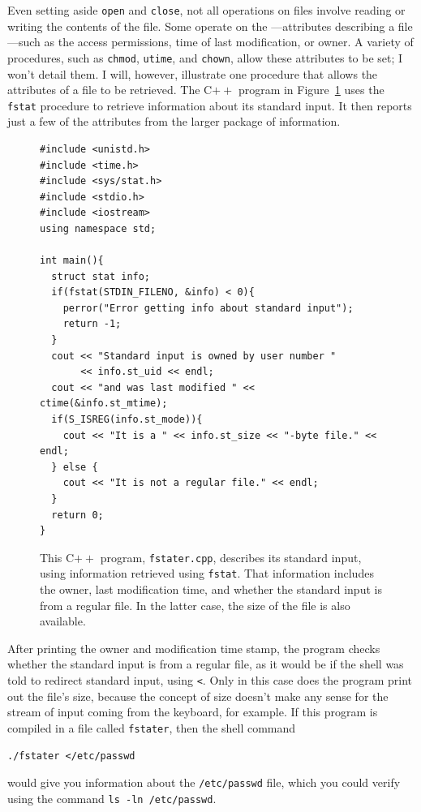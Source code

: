 Even setting aside \verb|open| and \verb|close|, not all operations
on files involve reading or writing the contents of the file.  Some
operate on the ---attributes
describing a file---such as the access
permissions, time of last modification, or owner.  A variety of
procedures, such as \verb|chmod|, \verb|utime|, and \verb|chown|,
allow these attributes to be set; I won't detail them.  I will,
however, illustrate one procedure that allows the attributes of a file
to be retrieved.  The C$++$ program in Figure~\ref{fstater-source} uses
the \verb|fstat| procedure to retrieve information about its standard
input.  It then reports just a few of the attributes from the larger
package of information.
\begin{figure}
\begin{verbatim}
#include <unistd.h>
#include <time.h>
#include <sys/stat.h>
#include <stdio.h>
#include <iostream>
using namespace std;

int main(){
  struct stat info;
  if(fstat(STDIN_FILENO, &info) < 0){
    perror("Error getting info about standard input");
    return -1;
  }
  cout << "Standard input is owned by user number "
       << info.st_uid << endl;
  cout << "and was last modified " << ctime(&info.st_mtime);
  if(S_ISREG(info.st_mode)){
    cout << "It is a " << info.st_size << "-byte file." << endl;
  } else {
    cout << "It is not a regular file." << endl;
  }
  return 0;
}
\end{verbatim}
\caption{This C$++$ program, {\tt fstater.cpp}, describes its standard
  input, using information retrieved using {\tt fstat}.  That
  information includes the owner, last modification time, and whether
  the standard input is from a regular file.  In the latter case, the
  size of the file is also available.}
\label{fstater-source}
\end{figure}
After printing the owner and modification time stamp, the program
checks whether the standard input is from a regular file, as it would
be if the shell was told to redirect standard input, using \verb|<|.
Only in this case does the program print out the file's size, because
the concept of size doesn't make any sense for the stream of input
coming from the keyboard, for example.  If this program is compiled in
a file called \verb|fstater|, then the shell command
\begin{verbatim}
./fstater </etc/passwd
\end{verbatim}
would give you information about the \verb|/etc/passwd| file, which
you could verify using the command \verb|ls -ln /etc/passwd|.

